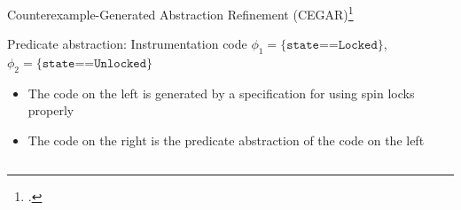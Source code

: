 \documentclass[aspectratio=169]{beamer}
\begin{document}
\begin{frame}{Counterexample-Generated Abstraction Refinement (CEGAR)\footcite{clarke2003counterexample,ball2001automatic,ball2001automatically}}
  \small
  \begin{tightcenter}
  \end{tightcenter}
\end{frame}

\begin{frame}{Predicate abstraction: Instrumentation code}
  \begingroup\footnotesize
  $\phi_1 = \texttt{\{state==Locked\}}$, $\phi_2 = \texttt{\{state==Unlocked\}}$

  \begin{itemize}[<+->]
  \item The code on the left is generated by a specification for using
    spin locks properly
  \item The code on the right is the predicate abstraction of the code on the left
  \end{itemize}
  \endgroup

  \begin{columns}[t]
    \begin{column}{0.45\textwidth}
      
    \end{column}
    \begin{column}{0.45\textwidth}
      
    \end{column}
  \end{columns}
\end{frame}
\end{document}
